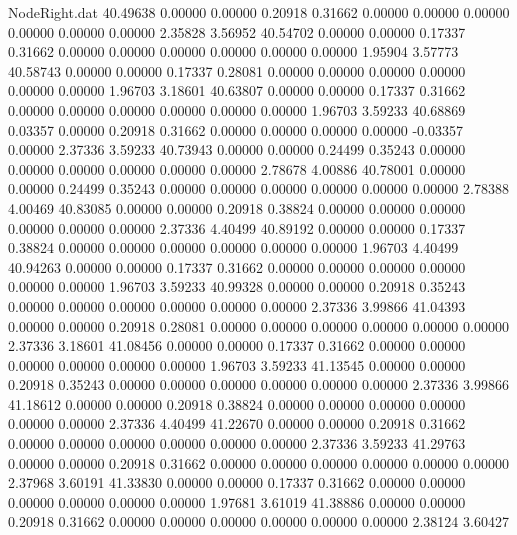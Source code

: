 \begin{filecontents}{NodeRight.dat}
  40.49638    0.00000    0.00000     0.20918    0.31662    0.00000    0.00000    0.00000    0.00000    0.00000    0.00000    2.35828    3.56952
  40.54702    0.00000    0.00000     0.17337    0.31662    0.00000    0.00000    0.00000    0.00000    0.00000    0.00000    1.95904    3.57773
  40.58743    0.00000    0.00000     0.17337    0.28081    0.00000    0.00000    0.00000    0.00000    0.00000    0.00000    1.96703    3.18601
  40.63807    0.00000    0.00000     0.17337    0.31662    0.00000    0.00000    0.00000    0.00000    0.00000    0.00000    1.96703    3.59233
  40.68869    0.03357    0.00000     0.20918    0.31662    0.00000    0.00000    0.00000    0.00000   -0.03357    0.00000    2.37336    3.59233
  40.73943    0.00000    0.00000     0.24499    0.35243    0.00000    0.00000    0.00000    0.00000    0.00000    0.00000    2.78678    4.00886
  40.78001    0.00000    0.00000     0.24499    0.35243    0.00000    0.00000    0.00000    0.00000    0.00000    0.00000    2.78388    4.00469
  40.83085    0.00000    0.00000     0.20918    0.38824    0.00000    0.00000    0.00000    0.00000    0.00000    0.00000    2.37336    4.40499
  40.89192    0.00000    0.00000     0.17337    0.38824    0.00000    0.00000    0.00000    0.00000    0.00000    0.00000    1.96703    4.40499
  40.94263    0.00000    0.00000     0.17337    0.31662    0.00000    0.00000    0.00000    0.00000    0.00000    0.00000    1.96703    3.59233
  40.99328    0.00000    0.00000     0.20918    0.35243    0.00000    0.00000    0.00000    0.00000    0.00000    0.00000    2.37336    3.99866
  41.04393    0.00000    0.00000     0.20918    0.28081    0.00000    0.00000    0.00000    0.00000    0.00000    0.00000    2.37336    3.18601
  41.08456    0.00000    0.00000     0.17337    0.31662    0.00000    0.00000    0.00000    0.00000    0.00000    0.00000    1.96703    3.59233
  41.13545    0.00000    0.00000     0.20918    0.35243    0.00000    0.00000    0.00000    0.00000    0.00000    0.00000    2.37336    3.99866
  41.18612    0.00000    0.00000     0.20918    0.38824    0.00000    0.00000    0.00000    0.00000    0.00000    0.00000    2.37336    4.40499
  41.22670    0.00000    0.00000     0.20918    0.31662    0.00000    0.00000    0.00000    0.00000    0.00000    0.00000    2.37336    3.59233
  41.29763    0.00000    0.00000     0.20918    0.31662    0.00000    0.00000    0.00000    0.00000    0.00000    0.00000    2.37968    3.60191
  41.33830    0.00000    0.00000     0.17337    0.31662    0.00000    0.00000    0.00000    0.00000    0.00000    0.00000    1.97681    3.61019
  41.38886    0.00000    0.00000     0.20918    0.31662    0.00000    0.00000    0.00000    0.00000    0.00000    0.00000    2.38124    3.60427

\end{filecontents}
